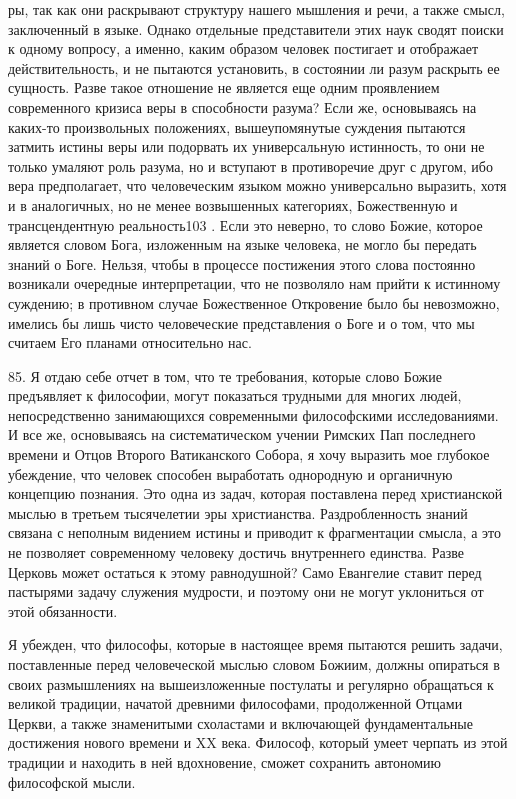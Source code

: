 \documentclass[a5paper,10pt]{article}
\begin{document}
ры, так как они раскрывают структуру нашего мышления и речи, а также смысл,
заключенный в языке. Однако отдельные представители этих наук сводят поиски к
одному вопросу, а именно, каким образом человек постигает и отображает
действительность, и не пытаются установить, в состоянии ли разум раскрыть ее
сущность. Разве такое отношение не является еще одним проявлением современного
кризиса веры в способности разума? Если же, основываясь на каких-то
произвольных положениях, вышеупомянутые суждения пытаются затмить истины веры
или подорвать их универсальную истинность, то они не только умаляют роль
разума, но и вступают в противоречие друг с другом, ибо вера предполагает, что
человеческим языком можно универсально выразить, хотя и в аналогичных, но не
менее возвышенных категориях, Божественную и трансцендентную реальность103 .
Если это неверно, то слово Божие, которое является словом Бога, изложенным на
языке человека, не могло бы передать знаний о Боге. Нельзя, чтобы в процессе
постижения этого слова постоянно возникали очередные интерпретации, что не
позволяло нам прийти к истинному суждению; в противном случае Божественное
Откровение было бы невозможно, имелись бы лишь чисто человеческие представления
о Боге и о том, что мы считаем Его планами относительно нас.

85. Я отдаю себе отчет в том, что те требования, которые слово Божие
предъявляет к философии, могут показаться трудными для многих людей,
непосредственно занимающихся современными философскими исследованиями. И все
же, основываясь на систематическом учении Римских Пап последнего времени и
Отцов Второго Ватиканского Собора, я хочу выразить мое глубокое убеждение, что
человек способен выработать однородную и органичную концепцию познания. Это
одна из задач, которая поставлена перед христианской мыслью в третьем
тысячелетии эры христианства. Раздробленность знаний связана с неполным
видением истины и приводит к фрагментации смысла, а это не позволяет
современному человеку достичь внутреннего единства. Разве Церковь может
остаться к этому равнодушной? Само Евангелие ставит перед пастырями задачу
служения мудрости, и поэтому они не могут уклониться от этой обязанности.

Я убежден, что философы, которые в настоящее время пытаются решить задачи,
поставленные перед человеческой мыслью словом Божиим, должны опираться в своих
размышлениях на вышеизложенные постулаты и регулярно обращаться к великой
традиции, начатой древними философами, продолженной Отцами Церкви, а также
знаменитыми схоластами и включающей фундаментальные достижения нового времени и
XX века. Философ, который умеет черпать из этой традиции и находить в ней
вдохновение, сможет сохранить автономию философской мысли.
\end{document}

